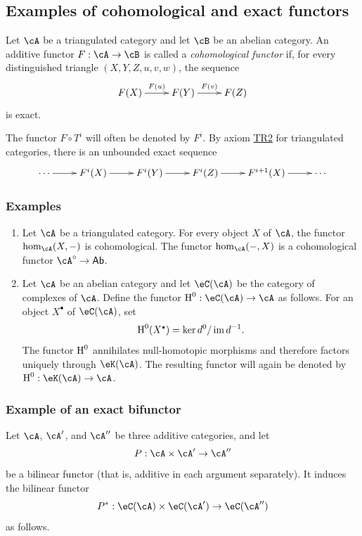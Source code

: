 \subsection{Examples of cohomological and exact functors}\label{VIII:1-3}

\begin{definition}
Let $\cA$ be a triangulated category and let $\cB$ be an abelian category.
An additive functor $F:\cA\to \cB$ is called a \emph{cohomological
functor} if, for every distinguished triangle $(X,Y,Z,u,v,w)$, the
sequence
\[\xymatrix{
  F(X) \ar[r]^-{F(u)}
    & F(Y) \ar[r]^-{F(v)}
    & F(Z)
}\]
is exact.
\end{definition}

The functor $F\circ T^i$ will often be denoted by $F^i$. By axiom
\hyperlink{VIII:TR2}{TR2} for triangulated categories, there is an
unbounded exact sequence
\[\xymatrix{
  \cdots \ar[r]
    & F^i(X) \ar[r]
    & F^i(Y) \ar[r]
    & F^i(Z) \ar[r]
    & F^{i+1}(X) \ar[r]
    & \cdots
}\]

\subsubsection{Examples}\label{VIII:1-3-2}

\begin{enumerate}
  \item Let $\cA$ be a triangulated category. For every object $X$ of
    $\cA$, the functor $\hom_\cA(X,-)$ is cohomological. The functor
    $\hom_\cA(-,X)$ is a cohomological functor
    $\cA^\circ\to\mathsf{Ab}$.
  \item Let $\cA$ be an abelian category and let $\eC(\cA)$ be the category
    of complexes of $\cA$. Define the functor
    $\h^0:\eC(\cA)\to\cA$ as follows. For an object $X^\bullet$ of
    $\eC(\cA)$, set
    \[
      \h^0(X^\bullet) = \ker d^0 / \im{d^{-1}} \text{.}
    \]
    The functor $\operatorname{H}^0$ annihilates null-homotopic morphisms and therefore
    factors uniquely through $\eK(\cA)$. The resulting functor will again
    be denoted by $\h^0:\eK(\cA) \to \cA$.
\end{enumerate}

\subsubsection{Example of an exact bifunctor}\label{VIII:1-3-3}

Let $\cA$, $\cA'$, and $\cA''$ be three additive categories, and let
\[
  P:\cA\times \cA'\to \cA''
\]
be a bilinear functor (that is, additive in each argument separately).
It induces the bilinear functor
\[
  P^\ast:\eC(\cA)\times \eC(\cA') \to \eC(\cA'')
\]
as follows.

